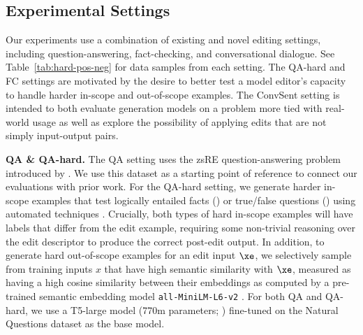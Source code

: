 \subsection{Experimental Settings}

Our experiments use a combination of existing and novel editing settings, including question-answering, fact-checking, and conversational dialogue. See Table~\ref{tab:hard-pos-neg} for data samples from each setting. The QA-hard and FC settings are motivated by the desire to better test a model editor's capacity to handle harder in-scope and out-of-scope examples. The ConvSent setting is intended to both evaluate generation models on a problem more tied with real-world usage as well as explore the possibility of applying edits that are not simply input-output pairs.

\textbf{QA \& QA-hard.} The QA setting uses the zsRE question-answering problem introduced by \citet{Cao2021EditingFK}. We use this dataset as a starting point of reference to connect our evaluations with prior work. For the QA-hard setting, we generate harder in-scope examples that test logically entailed facts () or true/false questions () using automated techniques \citep{demszky2018transforming,ribeiro2019red}. Crucially, both types of hard in-scope examples will have labels that differ from the edit example, requiring some non-trivial reasoning over the edit descriptor to produce the correct post-edit output. In addition, to generate hard out-of-scope examples for an edit input $\xe$, we selectively sample from training inputs $x$ that have high semantic similarity with $\xe$, measured as having a high cosine similarity between their embeddings as computed by a pre-trained semantic embedding model \texttt{all-MiniLM-L6-v2} \citep{reimers-2019-sentence-bert}. For both QA and QA-hard, we use a T5-large model (770m parameters; \citet{2020t5}) fine-tuned on the Natural Questions dataset \citep{kwiatkowski2019natural,roberts2020knowledge} as the base model.

